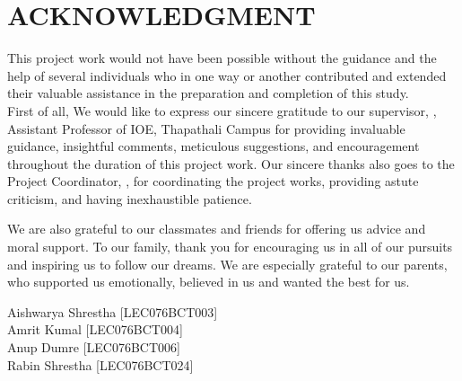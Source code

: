 \chapter*{{ACKNOWLEDGMENT}}
\vspace{10pt}
This project work would not have been possible without the guidance and the help of several individuals who in one way or another contributed and extended their valuable assistance in the preparation and completion of this study.\\
First of all, We would like to express our sincere gratitude to our supervisor, \textbf{\thesupervisor}, Assistant Professor of IOE, Thapathali Campus for providing invaluable guidance, insightful comments, meticulous suggestions, and encouragement throughout the duration of this project work. Our sincere thanks also goes to the Project Coordinator, \textbf{\theprojectcoordinator}, for coordinating the project works, providing astute criticism, and having inexhaustible patience.


We are also grateful to our classmates and friends for offering us advice and moral support. To our family, thank you for encouraging us in all of our pursuits and inspiring us to follow our dreams. We are especially grateful to our parents, who supported us emotionally, believed in us and wanted the best for us.

\vspace{1cm}

Aishwarya Shrestha [LEC076BCT003]\\
Amrit Kumal [LEC076BCT004]\\
Anup Dumre [LEC076BCT006]\\
Rabin Shrestha [LEC076BCT024]\\
\\
